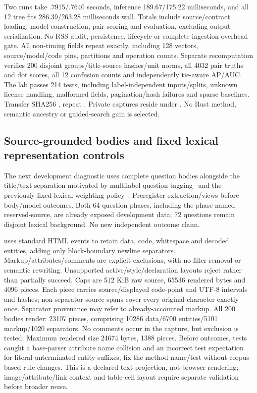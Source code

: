 \documentclass[11pt]{article}
\begin{document}
Two runs take .7915/.7640 seconds, inference 189.67/175.22 milliseconds,
and all 12 tree fits 286.39/263.28 milliseconds wall. Totals include source/contract
loading, model construction, pair scoring and evaluation, excluding output
serialization. No RSS audit, persistence, lifecycle or complete-ingestion
overhead gate. All non-timing fields repeat exactly, including 128 vectors,
source/model/code pins, partitions and operation counts. Separate recomputation
verifies 200 disjoint groups/title-source hashes/unit norms, all 4032 pair truths
and dot scores, all 12 confusion counts and independently tie-aware AP/AUC.
The lab passes 214 tests, including label-independent inputs/splits, unknown
license handling, malformed fields, pagination/hash failures and sparse baselines.
Transfer SHA256 ,
repeat .
Private captures reside under .
No Rust method, semantic ancestry or guided-search gain is selected.

\subsection{Source-grounded bodies and fixed lexical representation controls}
The next development diagnostic uses complete question bodies alongside the
title/text separation motivated by multilabel question tagging~\cite{mehta2015tagger}
and the previously fixed lexical weighting policy~\cite{tfidf}. Preregister
extraction/views before body/model outcomes. Both 64-question phases, including
the phase named reserved-source, are already exposed development data; 72 questions
remain disjoint lexical background. No new independent outcome claim.

 uses standard HTML events to retain data, code,
whitespace and decoded entities, adding only block-boundary newline separators.
Markup/attributes/comments are explicit exclusions, with no filler removal or
semantic rewriting. Unsupported active/style/declaration layouts reject rather
than partially succeed. Caps are 512 KiB raw source, 65536 rendered bytes and 4096
pieces. Each piece carries source/displayed code-point and UTF-8 intervals and
hashes; non-separator source spans cover every original character exactly once.
Separator provenance may refer to already-accounted markup. All 200 bodies render:
23107 pieces, comprising 10286 data/6700 entities/5101 markup/1020 separators.
No comments occur in the capture, but exclusion is tested. Maximum rendered
size 24674 bytes, 1388 pieces. Before outcomes, tests caught a base-parser attribute
name collision and an incorrect test expectation for literal unterminated entity
suffixes; fix the method name/test without corpus-based rule changes.
This is a declared text projection, not browser rendering; image/attribute/link
context and table-cell layout require separate validation before broader reuse.
\end{document}
